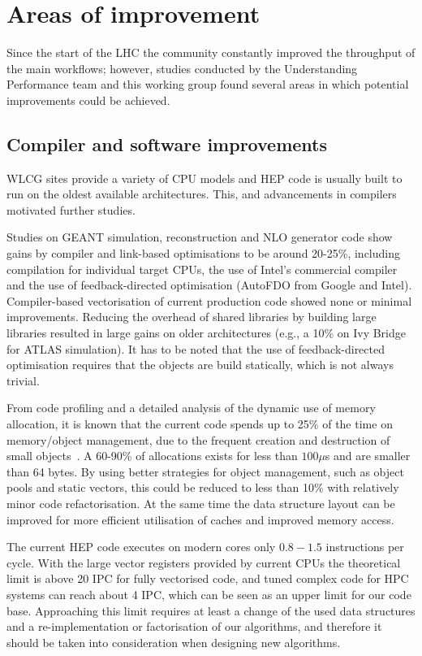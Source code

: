 \section{Areas of improvement}
Since the start of the LHC the community constantly improved the
throughput of the main workflows; however, studies conducted by the
Understanding Performance team and this working group found several
areas in which potential improvements could be
achieved.

\subsection{Compiler and software improvements}
WLCG sites provide a variety of CPU models and HEP code is usually
built to run on the oldest available architectures. This, and
advancements in compilers motivated further studies.

Studies on GEANT simulation, reconstruction and NLO generator code
show gains by compiler and link-based optimisations to be around
20-25\%, including compilation for individual target CPUs, the use of
Intel’s commercial compiler and the use of feedback-directed
optimisation (AutoFDO from Google and Intel). Compiler-based
vectorisation of current production code showed none or minimal
improvements. Reducing the overhead of shared libraries by building
large libraries resulted in large gains on older architectures (e.g.,
a 10\% on Ivy Bridge for ATLAS simulation). It has to be noted that
the use of feedback-directed optimisation requires that the objects
are build statically, which is not always trivial.

From code profiling and a detailed analysis of the dynamic use of
memory allocation, it is known that the current code spends up to 25\%
of the time on memory/object management, due to the frequent creation
and destruction of small objects~\cite{fomtools}. A 60-90\% of
allocations exists for less than $100\mu$s and are smaller than 64
bytes.  By using better strategies for object management, such as
object pools and static vectors, this could be reduced to less than
10\% with relatively minor code refactorisation. At the same time the
data structure layout can be improved for more efficient utilisation
of caches and improved memory access.

The current HEP code executes on modern cores only $0.8-1.5$
instructions per cycle. With the large vector registers provided by
current CPUs the theoretical limit is above 20 IPC for fully
vectorised code, and tuned complex code for HPC systems can reach
about 4 IPC, which can be seen as an upper limit for our code
base. Approaching this limit requires at least a change of the used
data structures and a re-implementation or factorisation of our
algorithms, and therefore it should be taken into consideration when
designing new algorithms.

